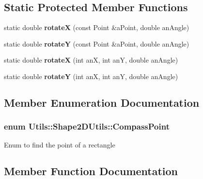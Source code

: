 \subsection*{Static Protected Member Functions}
\begin{DoxyCompactItemize}
\item 
static double {\bfseries rotateX} (const Point \&a\+Point, double an\+Angle)\hypertarget{class_utils_1_1_shape2_d_utils_a2b54dee36b497da4e9f99ce27cbc4470}{}\label{class_utils_1_1_shape2_d_utils_a2b54dee36b497da4e9f99ce27cbc4470}

\item 
static double {\bfseries rotateY} (const Point \&a\+Point, double an\+Angle)\hypertarget{class_utils_1_1_shape2_d_utils_ad09e100184c73aa040f9018d24ca5279}{}\label{class_utils_1_1_shape2_d_utils_ad09e100184c73aa040f9018d24ca5279}

\item 
static double {\bfseries rotateX} (int anX, int anY, double an\+Angle)\hypertarget{class_utils_1_1_shape2_d_utils_a961c5b62a418519b156d0fc100f03e8b}{}\label{class_utils_1_1_shape2_d_utils_a961c5b62a418519b156d0fc100f03e8b}

\item 
static double {\bfseries rotateY} (int anX, int anY, double an\+Angle)\hypertarget{class_utils_1_1_shape2_d_utils_a06068dc58423b2d9b4175d8b5584abff}{}\label{class_utils_1_1_shape2_d_utils_a06068dc58423b2d9b4175d8b5584abff}

\end{DoxyCompactItemize}


\subsection{Member Enumeration Documentation}
\subsubsection[{\texorpdfstring{Compass\+Point}{CompassPoint}}]{\setlength{\rightskip}{0pt plus 5cm}enum {\bf Utils\+::\+Shape2\+D\+Utils\+::\+Compass\+Point}}\hypertarget{class_utils_1_1_shape2_d_utils_a94cfd04764b56fdc1c43325fb8666cf5}{}\label{class_utils_1_1_shape2_d_utils_a94cfd04764b56fdc1c43325fb8666cf5}
Enum to find the point of a rectangle 

\subsection{Member Function Documentation}
